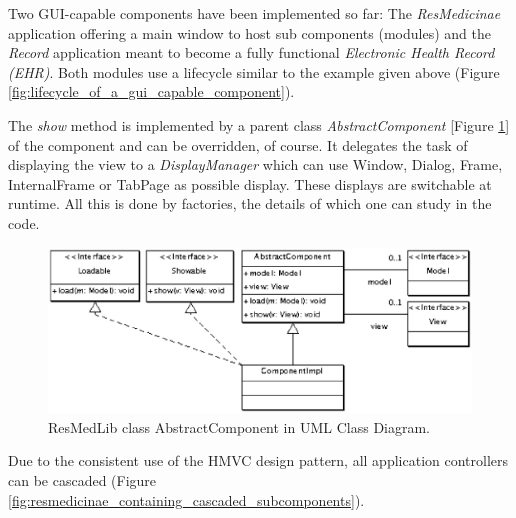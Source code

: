 \documentclass[a4paper,10pt]{llncs}
\begin{document}
Two GUI-capable components have been implemented so far:
The \emph{ResMedicinae} application offering a main window to host sub components (modules)
and the \emph{Record} application meant to become a fully functional \emph{Electronic Health Record (EHR)}. Both modules use a lifecycle similar to the example given above
(Figure \ref{fig:lifecycle_of_a_gui_capable_component}).

The \emph{show} method is implemented by a parent class \emph{AbstractComponent}
[Figure \ref{fig:resmedlib_class_abstractcomponent_in_uml_classdiagram}]
 of the component and can be overridden, of course.
It delegates the task of displaying the view to a \emph{DisplayManager} which can use
Window, Dialog, Frame, InternalFrame or TabPage as possible display. These displays are switchable at runtime.
All this is done by factories, the details of which one can study in the code.

\begin{figure}[ht]
\begin{center}
\includegraphics[scale=0.4]{resmedlib_class_abstractcomponent_in_uml_classdiagram}
\caption{ResMedLib class AbstractComponent in UML Class Diagram.}
\label{fig:resmedlib_class_abstractcomponent_in_uml_classdiagram}
\end{center}
\end{figure}

Due to the consistent use of the HMVC design pattern, all application controllers
can be cascaded (Figure \ref{fig:resmedicinae_containing_cascaded_subcomponents}).
\end{document}
